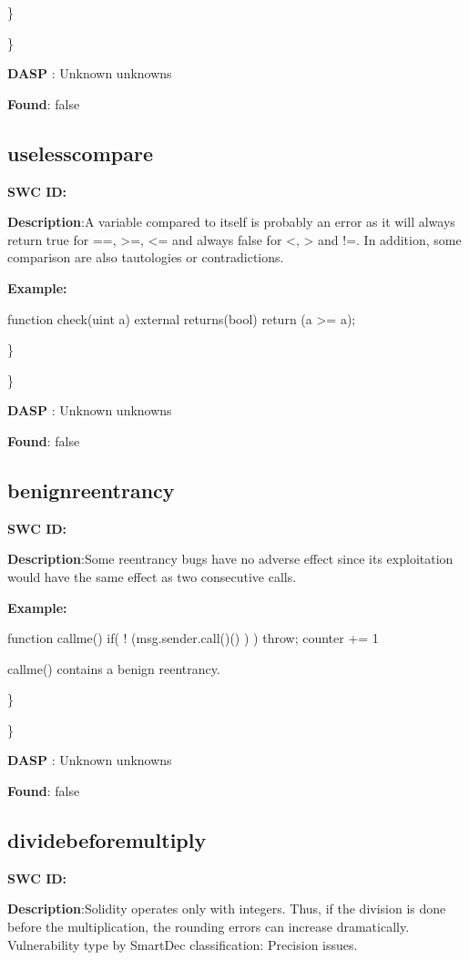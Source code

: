 \documentclass{article}
\begin{document}
{\} 

\} 

\textbf{DASP} : Unknown unknowns

\textbf{Found}: false

\subsection{useless\textunderscore compare} 
\textbf{SWC \textunderscore ID:} 

\textbf{Description}:A variable compared to itself is probably an error as it will always return true for ==, >=, <= and always false for <, > and !=. In addition, some comparison are also tautologies or contradictions.


\textbf{Example:} 

function check(uint a) external returns(bool){
    return (a >= a);
}

\} 

\} 

\textbf{DASP} : Unknown unknowns

\textbf{Found}: false

\subsection{benign\textunderscore reentrancy} 
\textbf{SWC \textunderscore ID:} 

\textbf{Description}:Some re\textendash entrancy bugs have no adverse effect since its exploitation would have the same effect as two consecutive calls.


\textbf{Example:} 

function callme(){
  if( ! (msg.sender.call()() ) ){
    throw;
  }
  counter += 1
}

callme() contains a benign reentrancy.

\} 

\} 

\textbf{DASP} : Unknown unknowns

\textbf{Found}: false

\subsection{divide\textunderscore before\textunderscore multiply} 
\textbf{SWC \textunderscore ID:} 

\textbf{Description}:Solidity operates only with integers. Thus, if the division is done before the multiplication, the rounding errors can increase dramatically. Vulnerability type by SmartDec classification: Precision issues.


}
\end{document}
